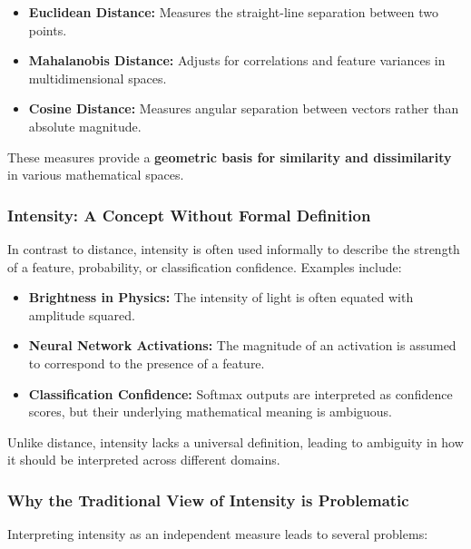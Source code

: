 \documentclass[12pt]{article}
\begin{document}
\begin{itemize}
    \item \textbf{Euclidean Distance:} Measures the straight-line separation between two points.
    \item \textbf{Mahalanobis Distance:} Adjusts for correlations and feature variances in multidimensional spaces.
    \item \textbf{Cosine Distance:} Measures angular separation between vectors rather than absolute magnitude.
\end{itemize}

These measures provide a \textbf{geometric basis for similarity and dissimilarity} in various mathematical spaces.

\subsubsection{Intensity: A Concept Without Formal Definition}

In contrast to distance, intensity is often used informally to describe the strength of a feature, probability, or classification confidence. Examples include:

\begin{itemize}
    \item \textbf{Brightness in Physics:} The intensity of light is often equated with amplitude squared.
    \item \textbf{Neural Network Activations:} The magnitude of an activation is assumed to correspond to the presence of a feature.
    \item \textbf{Classification Confidence:} Softmax outputs are interpreted as confidence scores, but their underlying mathematical meaning is ambiguous.
\end{itemize}

Unlike distance, intensity lacks a universal definition, leading to ambiguity in how it should be interpreted across different domains.

\subsubsection{Why the Traditional View of Intensity is Problematic}

Interpreting intensity as an independent measure leads to several problems:
\end{document}
